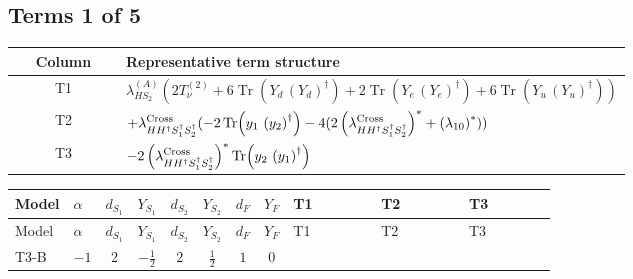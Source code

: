 \documentclass[8pt]{article}
\begin{document}
\begin{landscape}
\subsection*{Terms 1 of 5}
\begin{center}
\begin{tabular}{@{}c >{\raggedright\arraybackslash}p{0.82\linewidth}@{}}
\toprule
Column & Representative term structure \\
\midrule
T1 & \(\displaystyle {\lambda_{HS_2}^{(A)}} (2 T_{\nu}^{(2)}+6 \operatorname{Tr}\!\left({Y_d}\,\left({Y_d}\right)^{\dagger}\right)+2 \operatorname{Tr}\!\left({Y_e}\,\left({Y_e}\right)^{\dagger}\right)+6 \operatorname{Tr}\!\left({Y_u}\,\left({Y_u}\right)^{\dagger}\right))\) \\
\midrule
T2 & \(\displaystyle +{\lambda_{H H^\dagger S_1^\dagger S_2^\dagger}^{\rm Cross}} (-2 \operatorname{Tr}\!\left({y_1}\,\left({y_2}\right)^{\dagger}\right)-4 (2 \left({\lambda_{H H^\dagger S_1^\dagger S_2^\dagger}^{\rm Cross}}\right)^{*}+\left({\lambda_{10}}\right)^{*}))\) \\
\midrule
T3 & \(\displaystyle -2 \left({\lambda_{H H^\dagger S_1^\dagger S_2^\dagger}^{\rm Cross}}\right)^{*} \operatorname{Tr}\!\left({y_2}\,\left({y_1}\right)^{\dagger}\right)\) \\
\midrule
\bottomrule
\end{tabular}
\end{center}
\smallskip
\tiny
\begin{longtable}{@{}llcccccc >{\raggedright\arraybackslash}p{0.21\linewidth} >{\raggedright\arraybackslash}p{0.21\linewidth} >{\raggedright\arraybackslash}p{0.21\linewidth}@{}}
\toprule
Model & $\alpha$ & $d_{S_1}$ & $Y_{S_1}$ & $d_{S_2}$ & $Y_{S_2}$ & $d_F$ & $Y_F$ & T1 & T2 & T3 \\
\midrule
\endfirsthead
\toprule
Model & $\alpha$ & $d_{S_1}$ & $Y_{S_1}$ & $d_{S_2}$ & $Y_{S_2}$ & $d_F$ & $Y_F$ & T1 & T2 & T3 \\
\midrule
\endhead
T3-B & $-1$ & $2$ & $-\frac{1}{2}$ & $2$ & $\frac{1}{2}$ & $1$ & $0$ & \scriptsize\adjustbox{max width=\linewidth}{$\begin{gathered} {\lambda_{HS_2}^{(A)}} (2 T_{\nu}^{(2)}+6 \operatorname{Tr}\!\left({Y_d}\,\left({Y_d}\right)^{\dagger}\right)+2 \operatorname{Tr}\!\left({Y_e}\,\left({Y_e}\right)^{\dagger}\right)+6 \operatorname{Tr}\!\left({Y_u}\,\left({Y_u}\right)^{\dagger}\right))\end{gathered}$} & \scriptsize\adjustbox{max width=\linewidth}{$\begin{gathered} +{\lambda_{H H^\dagger S_1^\dagger S_2^\dagger}^{\rm Cross}} (-2 \operatorname{Tr}\!\left({y_1}\,\left({y_2}\right)^{\dagger}\right)-4 (2 \left({\lambda_{H H^\dagger S_1^\dagger S_2^\dagger}^{\rm Cross}}\right)^{*}+\left({\lambda_{10}}\right)^{*}))\end{gathered}$} & \scriptsize\adjustbox{max width=\linewidth}{$\begin{gathered} -2 \left({\lambda_{H H^\dagger S_1^\dagger S_2^\dagger}^{\rm Cross}}\right)^{*} \operatorname{Tr}\!\left({y_2}\,\left({y_1}\right)^{\dagger}\right)\end{gathered}$} \\

\end{longtable}
\end{landscape}
\end{document}
